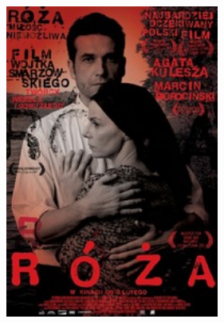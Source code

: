 \documentclass[12pt]{amsart}
\begin{document}
\begin{multicols}{2}
\begingroup
\centering

\includegraphics[width=7cm]{roza.jpg}

\endgroup


\end{multicols}
\end{document}

